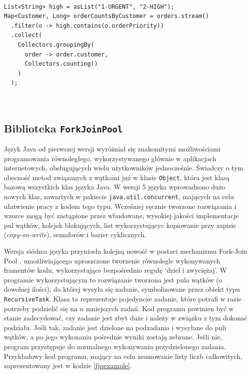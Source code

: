 \documentclass[12pt,twoside,openright]{extarticle}
\begin{document}
\begin{lstlisting}[label=advanced, caption=Zaawansowane wykorzystanie Stream API]

List<String> high = asList("1-URGENT", "2-HIGH");
Map<Customer, Long> orderCountsByCustomer = orders.stream()
  .filter(o -> high.contains(o.orderPriority))
  .collect(
    Collectors.groupingBy(
      order -> order.customer,
      Collectors.counting()
    )
  );
  
    

\end{lstlisting}

\subsection{Biblioteka \texttt{ForkJoinPool}}

    Język Java od pierwszej wersji wyróżniał się znakomitymi możliwościami programowania równoległego, wykorzystywanego głównie w aplikacjach internetowych, obsługujących wielu użytkowników jednocześnie. Świadczy o tym obecność metod związanych z wątkami już w klasie \texttt{Object}, która jest klasą bazową wszystkich klas języka Java. W wersji 5 języka wprowadzono dużo nowych klas, zawartych w pakiecie \texttt{java.util.concurrent}, mających na celu ułatwienie pracy z kodem tego typu. Wcześniej ręcznie tworzone rozwiązania i wzorce mogą być zastąpione przez wbudowane, wysokiej jakości implementacje pul wątków, kolejek blokujących, list wykorzystującyc kopiowanie przy zapisie (\textit{copy-on-write}), semaforów i barier cyklicznych.
    
    Wersja siódma języka przyniosła kolejną nowość w postaci mechanizmu Fork-Join Pool \cite{fjpdocs}, umożliwiającego uproszczone tworzenie równolegle wykonywanych framentów kodu, wykorzystujące bezpośrednio regułę `dziel i zwyciężaj'. W programie wykorzystującym to rozwiązanie tworzona jest pula wątków (o dowolnej ilości), do której wysyła się zadanie, symbolizowane przez obiekt typu \texttt{RecursiveTask}. Klasa ta reprezentuje pojedyncze zadanie, które potrafi w razie potrzeby podzielić się na $ n $ mniejszych zadań. Kod programu powinien być w stanie zadecydować, czy zadanie jest zbyt duże i należy w związku z tym dokonać podziału. Jeśli tak, zadanie jest dzielone na podzadania i wysyłane do puli wątków, a po jego wykonaniu pośrednie wyniki zostają zebrane. Jeśli nie, program przystępuje do normalnego wykonywania przydzielonego zadania.  Przykładowy kod programu, mający na celu zsumowanie listy liczb całkowitych, zaprezentowany jest w kodzie \ref{fjpexample}.
\end{document}
